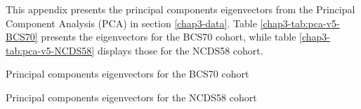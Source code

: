 This appendix presents the principal components eigenvectors from the Principal Component Analysis (PCA) in section \ref{chap3-data}. Table \ref{chap3-tab:pca-v5-BCS70} presents the eigenvectors for the BCS70 cohort, while table \ref{chap3-tab:pca-v5-NCDS58} displays those for the NCDS58 cohort.

\begin{table}[!hb]
    \centering
    \caption{Principal components eigenvectors for the BCS70 cohort}
    \label{chap3-tab:pca-v5-BCS70}
    \begin{threeparttable}
        
    \end{threeparttable}
\end{table}

\begin{table}[!htb]
    \centering
    \caption{Principal components eigenvectors for the NCDS58 cohort}
    \label{chap3-tab:pca-v5-NCDS58}
    \begin{threeparttable}
        
    \end{threeparttable}
\end{table}

